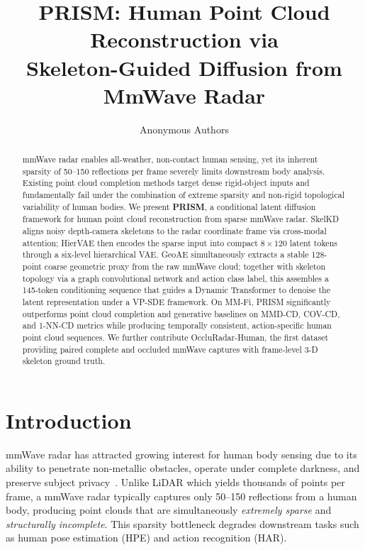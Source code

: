 \documentclass{article}
\title{\textcolor{prismblue}{\textbf{PRISM}}: Human \textcolor{prismblue}{P}oint Cloud \textcolor{prismblue}{R}econstruction v\textcolor{prismblue}{i}a \\
       \textcolor{prismblue}{S}keleton-Guided Diffusion from \textcolor{prismblue}{M}mWave Radar}
\author{Anonymous Authors}
\begin{document}
\maketitle

\begin{abstract}
mmWave radar enables all-weather, non-contact human sensing, yet its inherent
sparsity of 50--150 reflections per frame severely limits downstream body analysis.
Existing point cloud completion methods target dense rigid-object inputs and
fundamentally fail under the combination of extreme sparsity and non-rigid
topological variability of human bodies.
We present \textbf{PRISM}, a conditional latent diffusion framework for human
point cloud reconstruction from sparse mmWave radar.
SkelKD aligns noisy depth-camera skeletons to the radar coordinate frame via
cross-modal attention; HierVAE then encodes the sparse input into compact
$8\!\times\!120$ latent tokens through a six-level hierarchical VAE.
GeoAE simultaneously extracts a stable 128-point coarse geometric proxy from
the raw mmWave cloud; together with skeleton topology via a graph convolutional
network and action class label, this assembles a 145-token conditioning sequence
that guides a Dynamic Transformer to denoise the latent representation under
a VP-SDE framework.
On MM-Fi, PRISM significantly outperforms point cloud completion and generative
baselines on MMD-CD, COV-CD, and 1-NN-CD metrics while producing temporally
consistent, action-specific human point cloud sequences.
We further contribute OccluRadar-Human, the first dataset providing paired
complete and occluded mmWave captures with frame-level 3-D skeleton ground truth.
\end{abstract}

\section{Introduction}
\label{sec:intro}

mmWave radar has attracted growing interest for human body sensing due to its
ability to penetrate non-metallic obstacles, operate under complete darkness, and
preserve subject privacy~\cite{yang2023mmfi}.
Unlike LiDAR which yields thousands of points per frame, a mmWave radar typically
captures only 50--150 reflections from a human body, producing point clouds that
are simultaneously \emph{extremely sparse} and \emph{structurally incomplete}.
This sparsity bottleneck degrades downstream tasks such as human pose
estimation (HPE) and action recognition (HAR).
\end{document}

